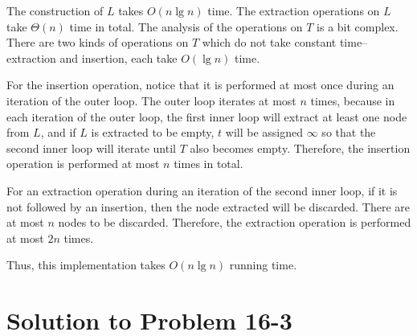 \documentclass[fleqn]{article}
\begin{document}
\begin{enumerate}
The construction of $L$ takes $O(n \lg n)$ time. The extraction
operations on $L$ take $\Theta(n)$ time in total. The analysis of the
operations on $T$ is a bit complex. There are two kinds of operations
on $T$ which do not take constant time--extraction and insertion, each
take $O(\lg n)$ time.

For the insertion operation, notice that it is performed at most once
during an iteration of the outer  loop. The outer 
loop iterates at most $n$ times, because in each iteration of the
outer loop, the first inner  loop will extract at least one
node from $L$, and if $L$ is extracted to be empty, $t$ will be
assigned $\infty$ so that the second inner loop will iterate until $T$
also becomes empty. Therefore, the insertion operation is performed at
most $n$ times in total.

For an extraction operation during an iteration of the second inner
loop, if it is not followed by an insertion, then the node extracted
will be discarded. There are at most $n$ nodes to be discarded.
Therefore, the extraction operation is performed at most $2n$ times.

Thus, this implementation takes $O(n \lg n)$ running time.

\end{enumerate}






\section*{Solution to Problem 16-3}
\end{document}

